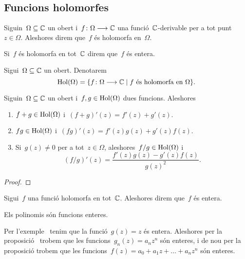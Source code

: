 \documentclass[../Apunts.tex]{subfiles}
\begin{document}
	\subsection{Funcions holomorfes}
	\begin{definition}
		\label{def:funció holomorfa}
		Siguin~\(\Omega\subseteq\mathbb{C}\) un obert i~\(f\colon\Omega\longrightarrow\mathbb{C}\) una funció~\(\mathbb{C}\)-derivable per a tot punt~\(z\in\Omega\). Aleshores direm que~\(f\) és holomorfa en~\(\Omega\).
		
		Si~\(f\) és holomorfa en tot~\(\mathbb{C}\) direm que~\(f\) és entera.
	\end{definition}
	\begin{notation}
		Sigui~\(\Omega\subseteq\mathbb{C}\) un obert. Denotarem
		\[\operatorname{Hol}(\Omega)=\{f\colon\Omega\longrightarrow\mathbb{C}\mid f\text{ és holomorfa en }\Omega\}.\]
	\end{notation}
	\begin{proposition}
		\label{prop:derivació de funcions holomorfes}
		Siguin~\(\Omega\subseteq\mathbb{C}\) un obert i~\(f,g\in\operatorname{Hol}(\Omega)\) dues funcions. Aleshores
		\begin{enumerate}
			\item \(f+g\in\operatorname{Hol}(\Omega)\) i~\((f+g)'(z)=f'(z)+g'(z)\).
			\item \(fg\in\operatorname{Hol}(\Omega)\) i~\((fg)'(z)=f'(z)g(z)+g'(z)f(z)\).
			\item Si~\(g(z)\neq0\) per a tot~\(z\in\Omega\), aleshores~\(f/g\in\operatorname{Hol}(\Omega)\) i
			\[(f/g)'(z)=\frac{f'(z)g(z)-g'(z)f(z)}{g(z)^{2}}.\]
		\end{enumerate}
	\end{proposition}
	\begin{proof}
	\end{proof}
	\begin{definition}
		\label{def:funció entera}
		Sigui~\(f\) una funció holomorfa en tot~\(\mathbb{C}\). Aleshores direm que~\(f\) és entera.
	\end{definition}
	\begin{example}
		Els polinomis són funcions enteres.
	\end{example}
	\begin{solution}
		Per l'exemple~ tenim que la funció~\(g(z)=z\) és entera. Aleshores per la proposició~ trobem que les funcions~\(g_{n}(z)=a_{n}z^{n}\) són enteres, i de nou per la proposició trobem que les funcions~\(f(z)=a_{0}+a_{1}z+\dots+a_{n}z^{n}\) són enteres.
	\end{solution}
\end{document}
